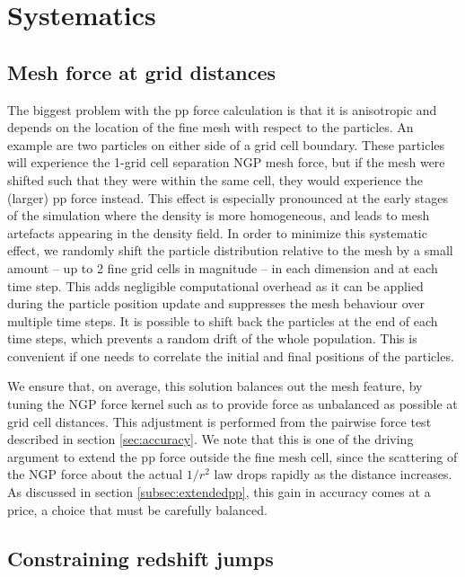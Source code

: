 \section{Systematics}
\label{sec:systematics}

\subsection{Mesh force at grid distances}

The biggest problem with the pp force calculation is that it 
is anisotropic and depends on the location of the fine mesh with respect 
to the particles. An example are two particles on either side of a grid 
cell boundary. These particles will experience the 1-grid cell separation
NGP mesh force, but if the mesh were shifted such that they were
within the same cell, they would experience the (larger) pp force instead. 
This effect is especially pronounced at the early stages of the simulation where
the density is more homogeneous, and leads to mesh artefacts appearing
in the density field. In order to minimize this systematic effect, 
we randomly shift the particle distribution relative to the mesh by a small
amount -- up to 2 fine grid cells in magnitude -- in each
dimension and at each time step.  This adds negligible computational
overhead as it can be applied during the particle position update
and suppresses the mesh behaviour over multiple time steps.
It is possible to shift back the particles at the end of each time steps,
which prevents a random drift of the whole population.
This is convenient if one needs to correlate the initial and final positions of the particles.
 
We ensure that, on average, this solution balances out the mesh feature,
by tuning the NGP force kernel such as to provide  force as unbalanced as possible at grid cell distances.
This adjustment is performed from the pairwise force test described in section \ref{sec:accuracy}.
We note that this is one of the driving argument to extend the pp force outside the fine mesh cell,
since the scattering of the NGP force about the actual $1/r^{2}$ law drops rapidly as the distance increases.
As discussed in section \ref{subsec:extendedpp}, this gain in accuracy comes at a price,
a choice that  must be carefully balanced.

\subsection{Constraining redshift jumps}

